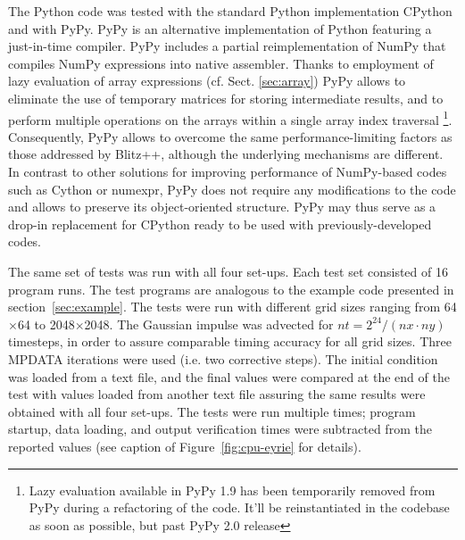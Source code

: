 \documentclass[final,5p,times,twocolumn]{elsarticle}
\begin{document}
  The Python code was tested with the standard Python implementation CPython and with PyPy.
  PyPy is an alternative implementation of Python featuring a just-in-time compiler. 
  PyPy includes a partial reimplementation of NumPy that compiles NumPy expressions into native assembler.
  Thanks to employment of lazy evaluation of array expressions (cf. Sect. \ref{sec:array})
    PyPy allows to eliminate the use of temporary matrices for storing intermediate results,
    and to perform multiple operations on the arrays within a single array index traversal
    \footnote{Lazy evaluation available in PyPy 1.9 has been temporarily removed from PyPy during a refactoring of
      the code. It'll be reinstantiated in the codebase as soon as possible, but past PyPy 2.0 release}.
  Consequently, PyPy allows to overcome the same performance-limiting factors as those addressed by Blitz++, although 
    the underlying mechanisms are different.
  In contrast to other solutions for improving performance of NumPy-based codes such as
    Cython or numexpr, PyPy does not require
    any modifications to the code and allows to preserve its object-oriented structure.
  PyPy may thus serve as a drop-in replacement for CPython ready to be used with 
    previously-developed codes.
  
  The same set of tests was run with all four set-ups.
  Each test set consisted of 16 program runs.
  The test programs are analogous to the example code presented in section~\ref{sec:example}.
  The tests were run with different grid sizes ranging from 64$\times$64 to 2048$\times$2048.
  The Gaussian impulse was advected for $nt=2^{24}/(nx\cdot ny)$ timesteps, 
    in order to assure comparable timing accuracy for all grid sizes.
  Three MPDATA iterations were used (i.e. two corrective steps).
  The initial condition was loaded from a text file, and the final values were compared at the end of the test
    with values loaded from another text file assuring the same results were obtained with all four set-ups.
  The tests were run multiple times; program startup, data loading, and output verification times were
    subtracted from the reported values (see caption of Figure~\ref{fig:cpu-eyrie} for details).
\end{document}
